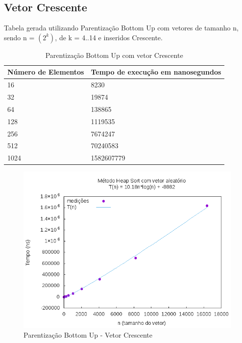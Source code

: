 \documentclass[12pt,a4paper,twoside]{report}
\begin{document}
\subsection{Vetor Crescente}
Tabela gerada utilizando Parentização Bottom Up com vetores de tamanho n, sendo n = $(2^k)$, de k = 4..14 e inseridos Crescente.
\begin{table}[H]
\centering
\caption{Parentização Bottom Up com vetor Crescente}
\label{my-label}
\begin{tabular}{|l|l|}
\hline
\multicolumn{1}{|c|}{\textbf{Número de Elementos}} & \multicolumn{1}{c|}{\textbf{Tempo de execução em nanosegundos}} \\ \hline
16 & 8230 \\ \hline
32 & 19874 \\ \hline
64 & 138865 \\ \hline
128 & 1119535 \\ \hline
256 & 7674247 \\ \hline
512 & 70240583 \\ \hline
1024 & 1582607779 \\ \hline
\end{tabular}
\end{table}

\begin{figure}[H]
    \centering
    \includegraphics[width=0.7\linewidth]{graficos/HeapSort/vIntAleatorio/vIntAleatorio.png}
  \caption{Parentização Bottom Up - Vetor Crescente}
\end{figure}
\end{document}

